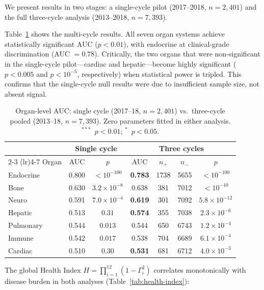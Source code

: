 \documentclass[aps,pre,twocolumn,superscriptaddress,floatfix]{revtex4-2}
\begin{document}
We present results in two stages: a single-cycle pilot
(2017--2018, $n=2{,}401$) and the full three-cycle
analysis (2013--2018, $n=7{,}393$).

Table~\ref{tab:auc} shows the multi-cycle results.
All seven organ systems achieve statistically significant
AUC ($p<0.01$), with endocrine at clinical-grade
discrimination (AUC $=0.78$).
Critically, the two organs that were non-significant
in the single-cycle pilot---cardiac and hepatic---become
highly significant ($p<0.005$ and $p<10^{-5}$,
respectively) when statistical power is tripled.
This confirms that the single-cycle null results were
due to insufficient sample size, not absent signal.

\begin{table}[t]
\centering
\caption{Organ-level AUC: single cycle (2017--18, $n=2{,}401$) vs.\
three-cycle pooled (2013--18, $n=7{,}393$).
Zero parameters fitted in either analysis.
$^{***}$~$p<0.01$; $^{*}$~$p<0.05$.}
\label{tab:auc}
\begin{tabular}{lcccccc}
\toprule
 & \multicolumn{2}{c}{Single cycle} & \multicolumn{4}{c}{Three cycles} \\
\cmidrule(lr){2-3} \cmidrule(lr){4-7}
Organ & AUC & $p$ & AUC & $n_+$ & $n_-$ & $p$ \\
\midrule
Endocrine  & 0.800 & $<\!10^{-100}$ & \textbf{0.783}  & 1738 & 5655 & $<\!10^{-100}$\rlap{$^{***}$} \\
Bone       & 0.630 & $3.2\!\times\!10^{-8}$ & 0.638 &  381 & 7012 & $<\!10^{-10}$\rlap{$^{***}$} \\
Neuro      & 0.591 & $7.0\!\times\!10^{-4}$ & \textbf{0.619} &  301 & 7092 & $5.8\!\times\!10^{-12}$\rlap{$^{***}$} \\
Hepatic    & 0.513 & $0.31$ & \textbf{0.574} &  355 & 7038 & $2.3\!\times\!10^{-6}$\rlap{$^{***}$} \\
Pulmonary  & 0.544 & $0.013$ & 0.544 &  650 & 6743 & $1.2\!\times\!10^{-4}$\rlap{$^{***}$} \\
Immune     & 0.542 & $0.017$ & 0.538 &  704 & 6689 & $6.1\!\times\!10^{-4}$\rlap{$^{***}$} \\
Cardiac    & 0.510 & $0.30$ & \textbf{0.531} &  681 & 6712 & $4.0\!\times\!10^{-3}$\rlap{$^{***}$} \\
\bottomrule
\end{tabular}
\end{table}

The global Health Index $H=\prod_{i=1}^{12}(1-\Gamma_i^2)$
correlates monotonically with disease burden in both
analyses (Table~\ref{tab:health-index}):
\end{document}
